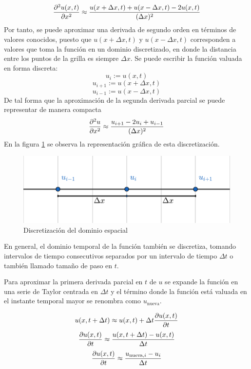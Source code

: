 \documentclass[12pt]{article}
\begin{document}
	\begin{equation}
		\pdv{^{2}u(x,t)}{x^2}\approx \frac{u(x + \Delta x,t) + u(x - \Delta x,t) - 2 u(x,t)}{(\Delta x)^2}
	\end{equation}
	Por tanto, se puede aproximar una derivada de segundo orden en términos de valores conocidos, puesto que $u(x + \Delta x,t)$ y $u(x - \Delta x,t)$ corresponden a valores que toma la función en un dominio discretizado, en donde la distancia entre los puntos de la grilla es siempre $\Delta x$. Se puede escribir la función valuada en forma discreta:
	\[u_{i} := u(x,t)\]
	\[u_{i+1} := u(x + \Delta x,t)\]
	\[u_{i-1} := u(x - \Delta x,t)\]
	De tal forma que la aproximación de la segunda derivada parcial se puede representar de manera compacta
	\begin{equation}
		\pdv{^{2}u}{x^2} \approx \frac{u_{i+1}-2u_{i}+u_{i-1}}{(\Delta x)^{2}}
		\label{eq:segunda-derivada-discreta}
	\end{equation}
	En la figura \ref{fig:discretizacion} se observa la representación gráfica de esta discretización.
	
	\begin{figure}[ht]
		\centering
		\includegraphics[scale=0.8]{images/grilla.pdf}
		\caption{Discretización del dominio espacial}
		\label{fig:discretizacion}
	\end{figure}
	
	
	En general, el dominio temporal de la función también se discretiza, tomando intervalos de tiempo consecutivos separados por un intervalo de tiempo $\Delta t$ o también llamado tamaño de paso en $t$. 
	
	\newpage
	Para aproximar la primera derivada parcial en $t$ de $u$ se expande la función en una serie de Taylor centrada en $\Delta t$ y el término donde la función está valuada en el instante temporal mayor se renombra como $u_{\text{nueva}}$.
	
	\[u(x,t+\Delta t)\approx u(x,t) + \Delta t \pdv{u(x,t)}{t}\]
	\[\pdv{u(x,t)}{t} \approx \frac{u(x,t+\Delta t) - u(x,t)}{\Delta t}\]
	\[\pdv{u(x,t)}{t} \approx \frac{u_{\text{nueva,} i} - u_{i}}{\Delta t}\]
	
\end{document}
